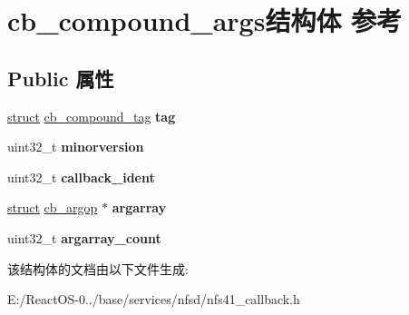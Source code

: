 \hypertarget{structcb__compound__args}{}\section{cb\+\_\+compound\+\_\+args结构体 参考}
\label{structcb__compound__args}
\subsection*{Public 属性}
\begin{DoxyCompactItemize}
\item 
\mbox{\label{structcb__compound__args_aea6146a59d6909d916025be8d4e2ebc7}} 
\hyperlink{interfacestruct}{struct} \hyperlink{structcb__compound__tag}{cb\+\_\+compound\+\_\+tag} {\bfseries tag}
\item 
\mbox{\label{structcb__compound__args_a2a52e2a893bc28450df1522f710de9fb}} 
uint32\+\_\+t {\bfseries minorversion}
\item 
\mbox{\label{structcb__compound__args_ac5d3a5866c56fa256dbd6cfbe4f491d1}} 
uint32\+\_\+t {\bfseries callback\+\_\+ident}
\item 
\mbox{\label{structcb__compound__args_ae255fac75fc8949f387fa5bc4ee8b484}} 
\hyperlink{interfacestruct}{struct} \hyperlink{structcb__argop}{cb\+\_\+argop} $\ast$ {\bfseries argarray}
\item 
\mbox{\label{structcb__compound__args_ae7aa4fb69fb02c3b8bac3f34b10dd6f7}} 
uint32\+\_\+t {\bfseries argarray\+\_\+count}
\end{DoxyCompactItemize}


该结构体的文档由以下文件生成\+:\begin{DoxyCompactItemize}
\item 
E\+:/\+React\+O\+S-\/0../base/services/nfsd/nfs41\+\_\+callback.\+h\end{DoxyCompactItemize}

